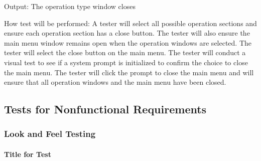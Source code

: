 \documentclass[12pt, titlepage]{article}
\begin{document}
\begin{enumerate}
Output: The operation type window closes
					
How test will be performed: A tester will select all possible operation sections and ensure each operation section has a close button. The tester will also ensure the main menu window remains open when the operation windows are selected. The tester will select the close button on the main menu. The tester will conduct a visual test to see if a system prompt is initialized to confirm the choice to close the main menu. The tester will click the prompt to close the main menu and will ensure that all operation windows and the main menu have been closed. 




\end{enumerate}

\subsection{Tests for Nonfunctional Requirements}

\subsubsection{Look and Feel Testing}
		
\paragraph{Title for Test}
\end{document}
